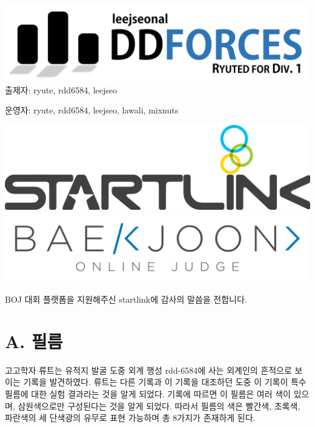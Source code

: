 \documentclass{article}
\begin{document}
\begin{center}
	\includegraphics[scale=0.3]{images/logo.pdf}
	\newline
	출제자: ryute, rdd6584, leejseo
	
	운영자: ryute, rdd6584, leejseo, lawali, mixnuts
\end{center}
\vspace{0.5cm}
\begin{center}
	\includegraphics[scale=0.5]{images/startlink.png}
	\includegraphics[scale=0.35]{images/boj.png}
	
	BOJ 대회 플랫폼을 지원해주신 startlink에 감사의 말씀을 전합니다.
\end{center}

\newpage

\section{A. 필름}
고고학자 류트는 유적지 발굴 도중 외계 행성 rdd-6584에 사는 외계인의 흔적으로 보이는 기록을 발견하였다. 류트는 다른 기록과 이 기록을 대조하던 도중 이 기록이 특수 필름에 대한 실험 결과라는 것을 알게 되었다. 기록에 따르면 이 필름은 여러 색이 있으며, 삼원색으로만 구성된다는 것을 알게 되었다. 따라서 필름의 색은 빨간색, 초록색, 파란색의 세 단색광의 유무로 표현 가능하며 총 8가지가 존재하게 된다.
\end{document}

